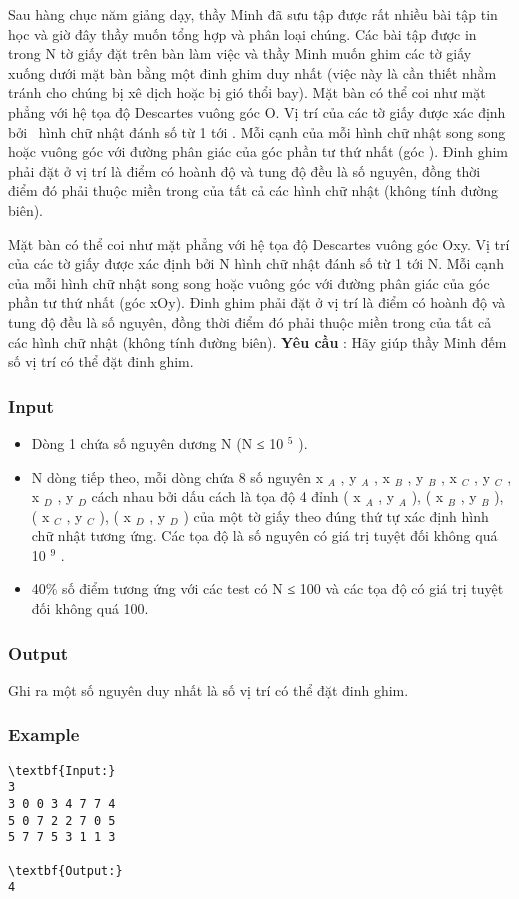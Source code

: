 



   Sau hàng chục năm giảng dạy, thầy Minh đã sưu tập được rất nhiều bài tập tin học và giờ đây thầy muốn tổng hợp và phân loại chúng. Các bài tập được in trong N tờ giấy đặt trên bàn làm việc và thầy Minh muốn ghim các tờ giấy xuống dưới mặt bàn bằng một đinh ghim duy nhất (việc này là cần thiết nhằm tránh cho chúng bị xê dịch hoặc bị gió thổi bay).       Mặt bàn có thể coi như mặt phẳng với hệ tọa độ Descartes vuông góc Ο. Vị trí của các tờ giấy được xác định bởi  hình chữ nhật đánh số từ 1 tới . Mỗi cạnh của mỗi hình chữ nhật song song hoặc vuông góc với đường phân giác của góc phần tư thứ nhất (góc ). Đinh ghim phải đặt ở vị trí là điểm có hoành độ và tung độ đều là số nguyên, đồng thời điểm đó phải thuộc miền trong của tất cả các hình chữ nhật (không tính đường biên).    

   Mặt bàn có thể coi như mặt phẳng với hệ tọa độ Descartes vuông góc Οxy. Vị trí của các tờ giấy được xác định bởi N hình chữ nhật đánh số từ 1 tới N. Mỗi cạnh của mỗi hình chữ nhật song song hoặc vuông góc với đường phân giác của góc phần tư thứ nhất (góc xOy). Đinh ghim phải đặt ở vị trí là điểm có hoành độ và tung độ đều là số nguyên, đồng thời điểm đó phải thuộc miền trong của tất cả các hình chữ nhật (không tính đường biên).  \textbf{    Yêu cầu   }   : Hãy giúp thầy Minh đếm số vị trí có thể đặt đinh ghim.    

\subsubsection{   Input  }
\begin{itemize}
	\item     Dòng 1 chứa số nguyên dương N (N ≤ 10    $^     5    $    ).   
	\item     N dòng tiếp theo, mỗi dòng chứa 8 số nguyên x    $_     A    $    , y    $_     A    $    , x    $_     B    $    , y    $_     B    $    , x    $_     C    $    , y    $_     C    $    , x    $_     D    $    , y    $_     D    $    cách nhau bởi dấu cách là tọa độ 4 đỉnh (         x    $_     A    $     , y     $_      A     $     ), (           x     $_      B     $      , y     $_      B     $     ), (           x     $_      C     $      , y     $_      C     $     ), (           x     $_      D     $      , y     $_      D     $     ) của một tờ giấy theo đúng thứ tự xác định hình chữ nhật tương ứng. Các tọa độ là số nguyên có giá trị tuyệt đối không quá 10     $^      9     $     .    
	\item      40\% số điểm tương ứng với các test có N         ≤ 100 và các tọa độ có giá trị tuyệt đối không quá 100.    
\end{itemize}

\subsubsection{   Output  }

   Ghi ra một số nguyên duy nhất là số vị trí có thể đặt đinh ghim.  

\subsubsection{   Example  }
\begin{verbatim}
\textbf{Input:}
3
3 0 0 3 4 7 7 4 
5 0 7 2 2 7 0 5 
5 7 7 5 3 1 1 3

\textbf{Output:}
4\end{verbatim}